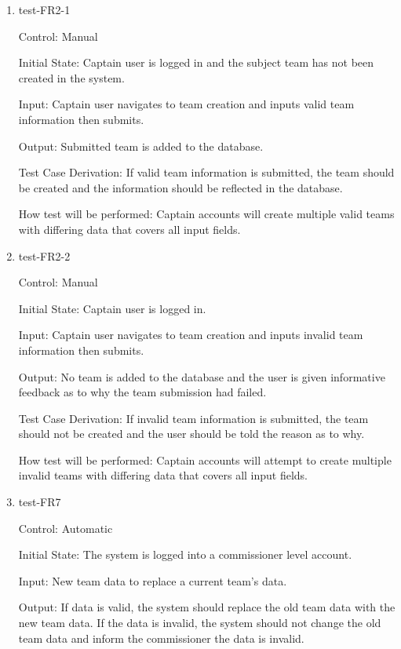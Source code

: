 \documentclass[12pt, titlepage]{article}
\begin{document}
\begin{enumerate}

  \item{test-FR2-1\\}

  Control: Manual

  Initial State: Captain user is logged in and the subject team has not been 
  created in the system.

  Input: Captain user navigates to team creation and inputs valid team 
  information then submits. 

  Output: Submitted team is added to the database.

  Test Case Derivation: If valid team information is submitted, the team
  should be created and the information should be reflected in the database.

  How test will be performed: Captain accounts will create multiple
  valid teams with differing data that covers all input fields.

  \item{test-FR2-2\\}

  Control: Manual

  Initial State: Captain user is logged in.

  Input: Captain user navigates to team creation and inputs invalid team 
  information then submits. 

  Output: No team is added to the database and the user is given informative 
  feedback as to why the team submission had failed.

  Test Case Derivation: If invalid team information is submitted, the team
  should not be created and the user should be told the reason as to why.

  How test will be performed: Captain accounts will attempt to create 
  multiple invalid teams with differing data that covers all input fields. 

  \item{test-FR7\\}

  Control: Automatic

  Initial State: The system is logged into a commissioner level account.

  Input: New team data to replace a current team's data.

  Output: If data is valid, the system should replace the old team data with the new
  team data. If the data is invalid, the system should not change the old team
  data and inform the commissioner the data is invalid.


\end{enumerate}
\end{document}
